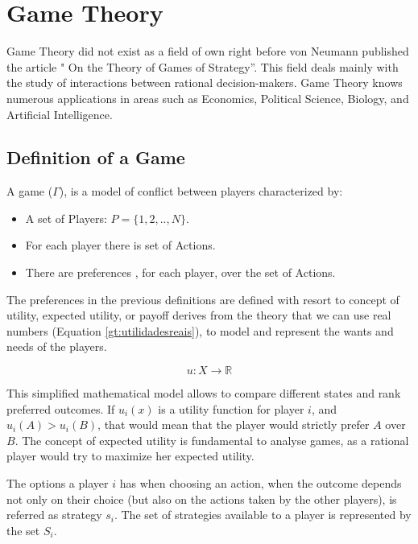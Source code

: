 \clearpage
\section{Game Theory}
\label{sec:background:game_theory}

Game Theory did not exist as a field of own right before von Neumann published the article " On the Theory of Games of Strategy''. This field deals mainly with the study of interactions between rational decision-makers\cite{Neumann1944}. Game Theory knows numerous applications in areas such as Economics, Political Science, Biology, and Artificial Intelligence. 

\subsection{Definition of a Game}
\label{subsec:background:game_theory_definition}

A game ($\Gamma$), is a model of conflict between players characterized by\cite{Osborne2004}\cite{OsbRub94}\cite{Fra2011}:
\begin{itemize}
\item A set of Players: $P=\{1, 2, .., N \}$.
\item For each player there is set of Actions.
\item There are preferences , for each player, over the set of Actions.
\end{itemize}


The preferences in the previous definitions are defined with resort to concept of utility, expected utility, or payoff derives from the theory that we can use real numbers (Equation \ref{gt:utilidadesreais}), to model and represent the wants and needs of the players. 

\begin{equation}
u:X\rightarrow\mathbb{R}
\label{gt:utilidadesreais}
\end{equation}

This simplified mathematical model allows to compare different states and rank preferred outcomes. If $u_{i}(x)$ is a utility function for player $i$, and $u_{i}(A)>u_{i}(B)$, that would mean that the player would strictly prefer $A$ over $B$. The concept of expected utility is fundamental to analyse games, as a rational player would try to maximize her expected utility\cite{Neumann1944}\cite{Osborne2004}.


The options a player $i$ has when choosing an action, when the outcome depends not only on their choice (but also on the actions taken by the other players), is referred as strategy $s_{i}$. The set of strategies available to a player is represented by the set $S_{i}$.

